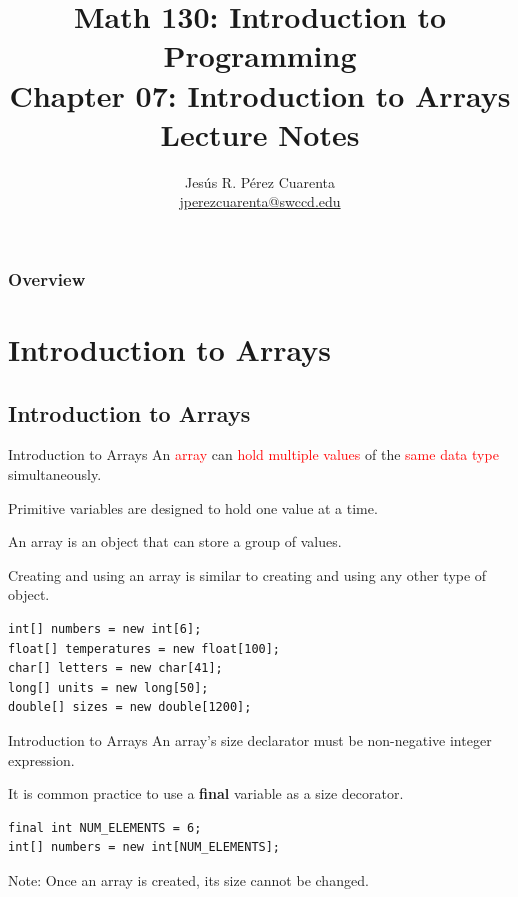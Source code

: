 \documentclass[11pt]{beamer}
\title[Chapter 07 Notes]{Math 130: Introduction to Programming \\ Chapter 07: Introduction to Arrays \\ Lecture Notes}
\author{Jesús R. Pérez Cuarenta \\
\href{mailto:jperezcuarenta@swccd.edu}{jperezcuarenta@swccd.edu}
}
\date{}
\newcommand{\red}[1]{\textcolor{red}{#1}}
\begin{document}
\begin{frame}
  \maketitle
\end{frame}

\begin{frame}
\frametitle{Overview}
    \begin{multicols}{2}
    \tableofcontents
    \end{multicols}
\end{frame}

\section{Introduction to Arrays}
\subsection{Introduction to Arrays}
\begin{frame}[fragile]{Introduction to Arrays}
    An \red{array} can \red{hold multiple values} of the \red{same data type} simultaneously. \\ \vspace{1em}

    Primitive variables are designed to hold one value at a time. \\ \vspace{1em}

    An array is an object that can store a group of values. \\ \vspace{1em}

    Creating and using an array is similar to creating and using any other type of object.

    \begin{lstlisting}
int[] numbers = new int[6];
float[] temperatures = new float[100];
char[] letters = new char[41];
long[] units = new long[50];
double[] sizes = new double[1200];
    \end{lstlisting}
\end{frame}

\begin{frame}[fragile]{Introduction to Arrays}
    An array's size declarator must be non-negative integer expression. \\ \vspace{1em}

    It is common practice to use a \textbf{final} variable as a size decorator. \\ \vspace{1em}

    \begin{lstlisting}
final int NUM_ELEMENTS = 6;
int[] numbers = new int[NUM_ELEMENTS];
    \end{lstlisting}

    Note: Once an array is created, its size cannot be changed.
\end{frame}
\end{document}
